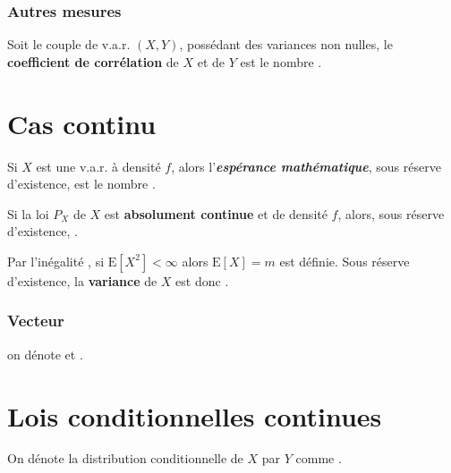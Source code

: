 \documentclass[10pt, french]{report}
\begin{document}
\begin{multicols*}{2}
\subsubsection{Autres mesures}
\begin{definitionNOHFILL}
Soit le couple de v.a.r. $(X, Y)$, possédant des variances non nulles, le \textbf{coefficient de corrélation} de $X$ et de $Y$ est le nombre .
\end{definitionNOHFILL}



\columnbreak
\section{Cas continu}
\begin{definitionNOHFILL}[Espérance]
Si $X$ est une v.a.r. à densité $f$, alors l'\textbf{\textit{espérance mathématique}}, sous réserve d'existence, est le nombre .

\bigskip

\begin{definitionNOHFILLprop}
Si la loi $P_{X}$ de $X$ est \textbf{absolument continue} et de densité $f$, alors, sous réserve d'existence, .
\end{definitionNOHFILLprop}
\end{definitionNOHFILL}


\begin{definitionNOHFILL}[Variance]
Par l'inégalité , si $\text{E}[X^{2}] < \infty$ alors $\text{E}[X] = m$ est définie. Sous réserve d'existence, la \textbf{variance} de $X$ est donc .
\end{definitionNOHFILL}


\subsubsection{Vecteur}
on dénote  et .



\columnbreak
\section{Lois conditionnelles continues}
On dénote la distribution conditionnelle de $X$ par $Y$ comme .




\end{multicols*}
\end{document}

